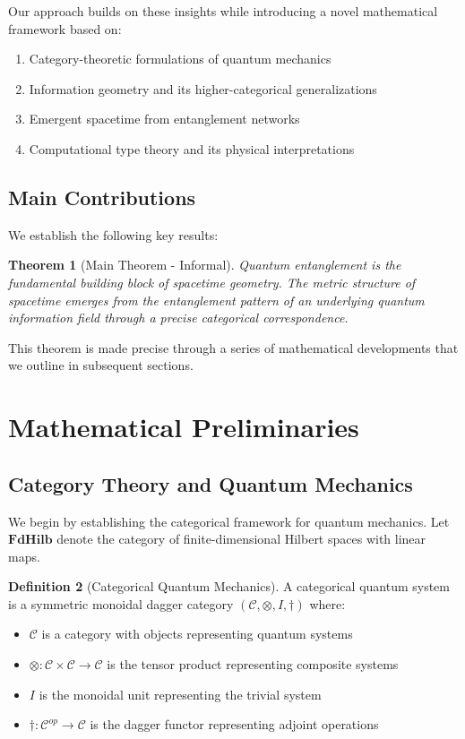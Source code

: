 \documentclass[12pt,a4paper]{article}
\newcommand{\FdHilb}{\mathbf{FdHilb}}
\theoremstyle{plain}
\newtheorem{theorem}{Theorem}[section]
\theoremstyle{definition}
\newtheorem{definition}[theorem]{Definition}
\theoremstyle{remark}
\begin{document}
Our approach builds on these insights while introducing a novel mathematical framework based on:
\begin{enumerate}
\item Category-theoretic formulations of quantum mechanics
\item Information geometry and its higher-categorical generalizations
\item Emergent spacetime from entanglement networks
\item Computational type theory and its physical interpretations
\end{enumerate}

\subsection{Main Contributions}

We establish the following key results:

\begin{theorem}[Main Theorem - Informal]
Quantum entanglement is the fundamental building block of spacetime geometry. The metric structure of spacetime emerges from the entanglement pattern of an underlying quantum information field through a precise categorical correspondence.
\end{theorem}

This theorem is made precise through a series of mathematical developments that we outline in subsequent sections.

\section{Mathematical Preliminaries}

\subsection{Category Theory and Quantum Mechanics}

We begin by establishing the categorical framework for quantum mechanics. Let $\FdHilb$ denote the category of finite-dimensional Hilbert spaces with linear maps.

\begin{definition}[Categorical Quantum Mechanics]
A categorical quantum system is a symmetric monoidal dagger category $(\mathcal{C}, \otimes, I, \dagger)$ where:
\begin{itemize}
\item $\mathcal{C}$ is a category with objects representing quantum systems
\item $\otimes: \mathcal{C} \times \mathcal{C} \to \mathcal{C}$ is the tensor product representing composite systems
\item $I$ is the monoidal unit representing the trivial system
\item $\dagger: \mathcal{C}^{op} \to \mathcal{C}$ is the dagger functor representing adjoint operations
\end{itemize}
\end{definition}
\end{document}
